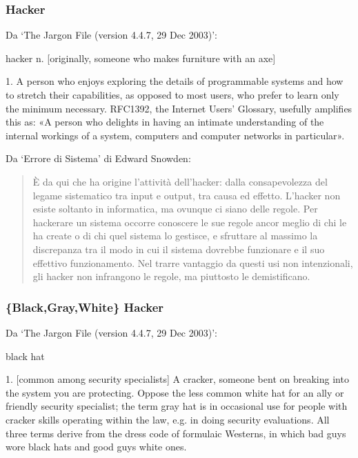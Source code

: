 \documentclass{beamer}
\begin{document}
\subsubsection*{Hacker}
\begin{frame}{\insertsubsection}{\insertsubsubsection}
Da `The Jargon File (version 4.4.7, 29 Dec 2003)':

\begin{block}{\insertsubsubsection}
\alert{hacker} n. [originally, someone who makes furniture with an axe]

1. A person who enjoys exploring the details of programmable
   systems and how to stretch their capabilities, as opposed to most
   users, who prefer to learn only the minimum necessary. RFC1392,
   the Internet Users' Glossary, usefully amplifies this as: «A
   person who delights in having an intimate understanding of the
   internal workings of a system, computers and computer networks in
   particular».
\end{block}
\end{frame}

\begin{frame}{\insertsubsection}{\insertsubsubsection}
Da `Errore di Sistema' di Edward Snowden:

\begin{quotation}
È da qui che ha origine l'attività dell'hacker: dalla consapevolezza del
legame sistematico tra input e output, tra causa ed effetto. L'hacker
non esiste soltanto in informatica, ma ovunque ci siano delle regole.
Per hackerare un sistema occorre conoscere le sue regole ancor meglio di
chi le ha create o di chi quel sistema lo gestisce, e sfruttare al
massimo la discrepanza tra il modo in cui il sistema dovrebbe funzionare
e il suo effettivo funzionamento. Nel trarre vantaggio da questi usi non
intenzionali, gli hacker non infrangono le regole, ma piuttosto le
demistificano.
\end{quotation}
\end{frame}

\subsubsection*{\{Black,Gray,White\} Hacker}
\begin{frame}{\insertsubsection}{\insertsubsubsection}
Da `The Jargon File (version 4.4.7, 29 Dec 2003)':

\begin{block}{\insertsubsubsection}
\alert{black hat}

1. [common among security specialists] A \alert{cracker}, someone bent on
   breaking into the system you are protecting. Oppose the less common
   \alert{white hat} for an ally or friendly security specialist; the term
   \alert{gray hat} is in occasional use for people with cracker skills operating
   within the law, e.g. in doing security evaluations. All three terms
   derive from the dress code of formulaic Westerns, in which bad guys
   wore black hats and good guys white ones.
\end{block}
\end{frame}
\end{document}
